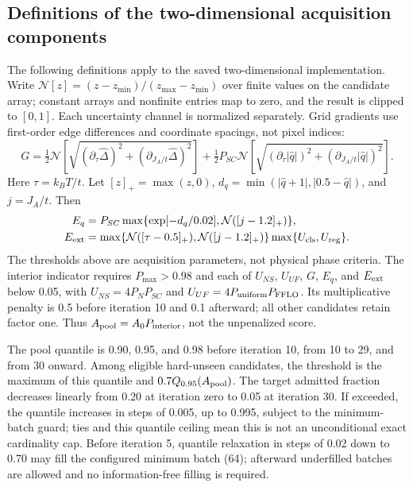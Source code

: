 \subsection{Definitions of the two-dimensional acquisition components}\label{sec:acq-definitions}
The following definitions apply to the saved two-dimensional implementation. Write $\mathcal N[z]=(z-z_{\min})/(z_{\max}-z_{\min})$ over finite values on the candidate array; constant arrays and nonfinite entries map to zero, and the result is clipped to $[0,1]$. Each uncertainty channel is normalized separately. Grid gradients use first-order edge differences and coordinate spacings, not pixel indices:
\begin{equation}
G=\tfrac12\mathcal N\!\left[\sqrt{(\partial_\tau\hat\Delta)^2+(\partial_{J_A/t}\hat\Delta)^2}\right]
+\tfrac12 P_{SC}\mathcal N\!\left[\sqrt{(\partial_\tau|\hat q|)^2+(\partial_{J_A/t}|\hat q|)^2}\right].\label{eq:gradient}
\end{equation}
Here $\tau=k_BT/t$. Let $[z]_+=\max(z,0)$, $d_q=\min(|\hat q+1|,|0.5-\hat q|)$, and $j=J_A/t$. Then
\begin{align}
E_q&=P_{SC}\max\{\exp[-d_q/0.02],\mathcal N([j-1.2]_+)\},\label{eq:eq-risk}\\
E_{\rm ext}&=\max\{\mathcal N([\tau-0.5]_+),\mathcal N([j-1.2]_+)\}\max\{U_{\rm cls},U_{\rm reg}\}.\label{eq:extrapolation}
\end{align}
The thresholds above are acquisition parameters, not physical phase criteria. The interior indicator requires $P_{\max}>0.98$ and each of $U_{NS}$, $U_{UF}$, $G$, $E_q$, and $E_{\rm ext}$ below 0.05, with $U_{NS}=4P_NP_{SC}$ and $U_{UF}=4P_{\rm uniform}P_{\rm FFLO}$. Its multiplicative penalty is 0.5 before iteration 10 and 0.1 afterward; all other candidates retain factor one. Thus $A_{\rm pool}=A_0P_{\rm interior}$, not the unpenalized score.

The pool quantile is 0.90, 0.95, and 0.98 before iteration 10, from 10 to 29, and from 30 onward. Among eligible hard-unseen candidates, the threshold is the maximum of this quantile and $0.7Q_{0.95}(A_{\rm pool})$. The target admitted fraction decreases linearly from 0.20 at iteration zero to 0.05 at iteration 30. If exceeded, the quantile increases in steps of 0.005, up to 0.995, subject to the minimum-batch guard; ties and this quantile ceiling mean this is not an unconditional exact cardinality cap. Before iteration 5, quantile relaxation in steps of 0.02 down to 0.70 may fill the configured minimum batch (64); afterward underfilled batches are allowed and no information-free filling is required.

